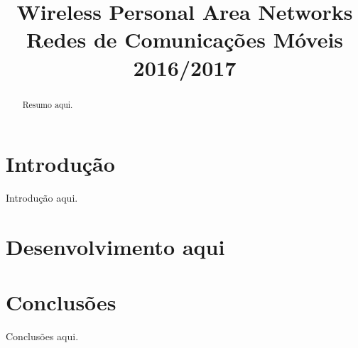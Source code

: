 \documentclass[conference]{IEEEtran}
\begin{document}
\title{Wireless Personal Area Networks\\
  \large Redes de Comunicações Móveis\\
  2016/2017
}

\author{
\and
{}
}

\maketitle

\begin{abstract}
Resumo aqui.
\end{abstract}


\IEEEpeerreviewmaketitle


\section{Introdução}
Introdução aqui.

\section{Desenvolvimento aqui}




\section{Conclusões}
Conclusões aqui.

{}

\end{document}
